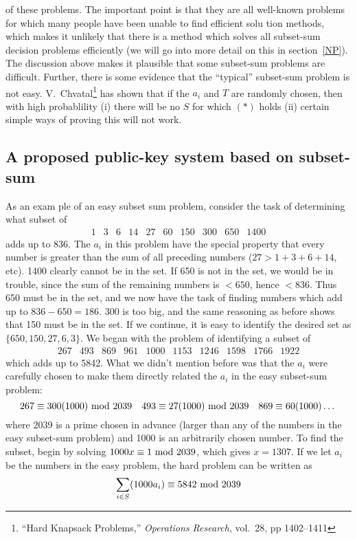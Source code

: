 of these problems.  The important point is that they are all well-known
problems for which many people have been unable to find efficient solu%
tion methods, which makes it unlikely that there is a method which solves
all subset-sum decision problems efficiently (we will go into more detail
on this in section~\ref{NP}).
\pq The discussion above makes it plausible that some subset-sum problems
are difficult.  Further, there is some evidence that the ``typical''
subset-sum problem is not easy.
V.~Chvatal\footnote{``Hard Knapsack Problems,'' {\it Operations Research},
vol.~28, pp 1402--1411} has shown that if the $a_i$ and $T$
 are randomly chosen, then with high probablility (i) there will be no
$S$ for which $(*)$ holds (ii) certain simple ways of proving this will
not work.
\subsection{A proposed public-key system based on subset-sum}As an exam%
ple of an easy subset sum problem, consider the task of determining
what subset of $$\begin{array}{*{10}{r}}1&3&6&14&27&60&150&300&650&1400
\end{array}$$ adds up to 836.  The $a_i$ in this problem have the special
property that every number is greater than the sum of all preceding 
numbers ($27>1+3+6+14$, etc).  1400 clearly cannot be in the set.  If
650 is not in the set, we would be in trouble, since the sum of the
remaining numbers is $<650$, hence $<836$.  Thus 650 must be in the 
set, and we now have the task of finding numbers which add up to $836-650
=186$.  300 is too big, and the same reasoning as before shows that 150
must be in the set.  If we continue, it is easy to identify the desired
set as $\{650,150,27,6,3\}$.
\pq We began with the problem of identifying a subset of
$$\begin{array}{*{10}{r}}267&493&869&961&1000&1153&
1246&1598&1766&1922\end{array}$$ which adds up to 5842. 
What we didn't mention before was that the $a_i$ were carefully
chosen to make them directly related the $a_i$ in the easy subset-sum
problem:$$267\equiv300(1000)\hbox{ mod }2039\quad493\equiv27(1000)\hbox{ mod }2039\quad
869\equiv60(1000)\dots$$where 2039 is a prime chosen in
advance (larger than any of the numbers in the easy subset-sum problem)
and 1000 is an arbitrarily chosen number.
\pq To find the subset, begin by solving $1000x\equiv1\hbox{ mod }2039$, which
gives $x=1307$.  If we let $a_i$ be the numbers in the easy problem,
the hard problem can be written as$$\sum_{i\in S}(1000a_i)\equiv5842\hbox{ mod }2039$$
